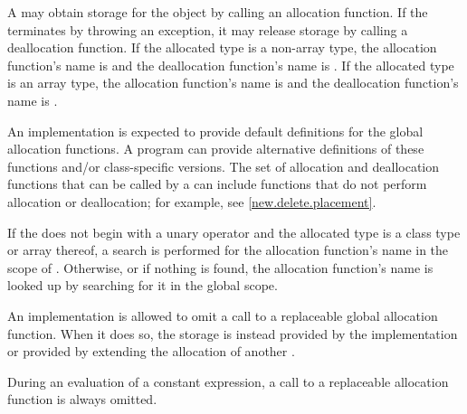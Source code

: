 \pnum
A  may obtain storage for the object by calling an
allocation function. If
the  terminates by throwing an exception, it
may release storage by calling a deallocation
function. If the allocated type
is a non-array type, the allocation function's name is
%
%
 and the deallocation function's name is
. If the allocated type is an array type, the
allocation function's name is
%
%
and the deallocation function's name is
.
\begin{note}
An implementation is expected to provide default definitions for the global
allocation
functions.
A \Cpp{} program can provide alternative definitions of
these functions and/or class-specific
versions.
The set of allocation and deallocation functions that can be called
by a 
can include functions that do not perform allocation or deallocation;
for example, see \ref{new.delete.placement}.
\end{note}

\pnum
{}%
If the 
does not begin with a unary \tcode{::} operator and
the allocated type is a class type  or array thereof,
a search is performed for the allocation function's name in the scope
of .
Otherwise, or if nothing is found,
the allocation function's name is looked up by
searching for it in the global scope.

\pnum
An implementation is allowed to omit a call to a replaceable global allocation
function. When it does so,
the storage is instead provided by the implementation or provided by extending
the allocation of another .

\pnum
During an evaluation of a constant expression,
a call to a replaceable allocation function is always omitted.

